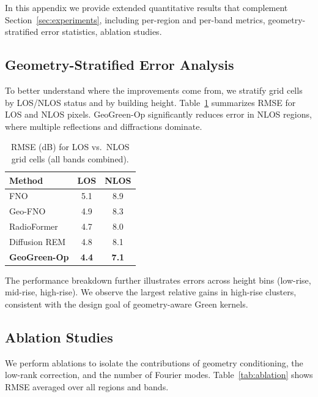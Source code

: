 \documentclass{article}
\begin{document}
In this appendix we provide extended quantitative results that complement
Section~\ref{sec:experiments}, including per-region and per-band metrics,
geometry-stratified error statistics, ablation studies.




\subsection{Geometry-Stratified Error Analysis}

To better understand where the improvements come from,
we stratify grid cells by LOS/NLOS status and by building height.
Table~\ref{tab:los_nlos} summarizes RMSE for LOS and NLOS pixels.
GeoGreen-Op significantly reduces error in NLOS regions, where
multiple reflections and diffractions dominate.

\begin{table}[t]
\centering
\caption{RMSE (dB) for LOS vs.\ NLOS grid cells (all bands combined).}
\label{tab:los_nlos}
\begin{tabular}{lcc}
\toprule
Method & LOS & NLOS \\
\midrule
FNO                 & 5.1 & 8.9 \\
Geo-FNO             & 4.9 & 8.3 \\
RadioFormer         & 4.7 & 8.0 \\
Diffusion REM       & 4.8 & 8.1 \\
\textbf{GeoGreen-Op} & \textbf{4.4} & \textbf{7.1} \\
\bottomrule
\end{tabular}
\end{table}

The performance breakdown further illustrates
errors across height bins (low-rise, mid-rise, high-rise).
We observe the largest relative gains in high-rise clusters,
consistent with the design goal of geometry-aware Green kernels.

\subsection{Ablation Studies}

We perform ablations to isolate the contributions of geometry conditioning,
the low-rank correction, and the number of Fourier modes.
Table~\ref{tab:ablation} shows RMSE averaged over all regions and bands.
\end{document}
